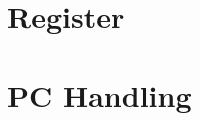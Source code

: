 \documentclass[paper=a4,fontsize=12pt]{scrreprt}
\begin{document}
\section{Register}








\section{PC Handling}

\end{document}
